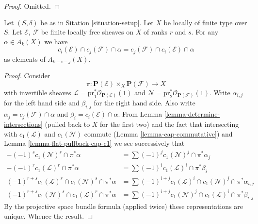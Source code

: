 \begin{proof}
Omitted.
\end{proof}

\begin{lemma}
\label{lemma-cap-commutative-chern}
Let $(S, \delta)$ be as in Sitation \ref{situation-setup}.
Let $X$ be locally of finite type over $S$.
Let $\mathcal{E}$, $\mathcal{F}$ be finite locally free sheaves on $X$
of ranks $r$ and $s$.
For any $\alpha \in A_k(X)$ we have
$$
c_i(\mathcal{E}) \cap c_j(\mathcal{F}) \cap \alpha
=
c_j(\mathcal{F}) \cap c_i(\mathcal{E}) \cap \alpha
$$
as elements of $A_{k - i - j}(X)$.
\end{lemma}

\begin{proof}
Consider
$$
\pi : \mathbf{P}(\mathcal{E}) \times_X \mathbf{P}(\mathcal{F})
\longrightarrow
X
$$
with invertible sheaves
$\mathcal{L} = \text{pr}_1^*\mathcal{O}_{\mathbf{P}(\mathcal{E})}(1)$
and
$\mathcal{N} = \text{pr}_2^*\mathcal{O}_{\mathbf{P}(\mathcal{F})}(1)$.
Write $\alpha_{i, j}$ for the left hand side and $\beta_{i, j}$
for the right hand side. Also write
$\alpha_j = c_j(\mathcal{F}) \cap \alpha$ and 
$\beta_i = c_i(\mathcal{E}) \cap \alpha$.
From Lemma \ref{lemma-determine-intersections}
(pulled back to $X$ for the first two)
and the fact that intersecting with $c_1(\mathcal{L})$ and
$c_1(\mathcal{N})$ commute (Lemma \ref{lemma-cap-commutative})
and Lemma \ref{lemma-flat-pullback-cap-c1}
we see successively that
\begin{align*}
-(-1)^s c_1(\mathcal{N})^s \cap \pi^*\alpha
& =
\sum (-1)^j c_1(\mathcal{N})^j \cap \pi^*\alpha_j \\
-(-1)^r c_1(\mathcal{L})^r \cap \pi^*\alpha
& =
\sum (-1)^i c_1(\mathcal{L})^i \cap \pi^*\beta_i \\
(-1)^{r + s}c_1(\mathcal{L})^r \cap c_1(\mathcal{N})^s \cap \pi^*\alpha
& =
\sum
(-1)^{i + j}
c_1(\mathcal{L})^i \cap c_1(\mathcal{N})^j \cap \pi^*\alpha_{i, j} \\
(-1)^{r + s}c_1(\mathcal{N})^s \cap c_1(\mathcal{L})^r \cap \pi^*\alpha
& =
\sum
(-1)^{i + j}
c_1(\mathcal{N})^j \cap c_1(\mathcal{L})^i \cap \pi^*\beta_{i, j}
\end{align*}
By the projective space bundle formula (applied twice) these representations
are unique. Whence the result.
\end{proof}









